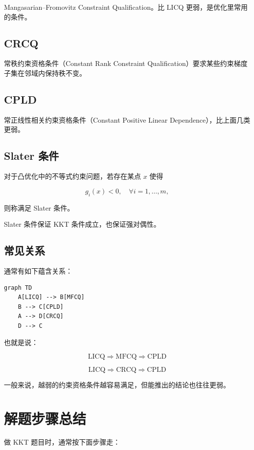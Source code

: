Mangasarian–Fromovitz Constraint Qualification。比 LICQ 更弱，是优化里常用的条件。

\subsection{CRCQ}

常秩约束资格条件（Constant Rank Constraint Qualification）要求某些约束梯度子集在邻域内保持秩不变。

\subsection{CPLD}

常正线性相关约束资格条件（Constant Positive Linear Dependence），比上面几类更弱。

\subsection{Slater 条件}

对于凸优化中的不等式约束问题，若存在某点 \(x\) 使得

\[
g_i(x) < 0,\quad \forall i=1,\dots,m,
\]

则称满足 Slater 条件。

Slater 条件保证 KKT 条件成立，也保证强对偶性。

\subsection{常见关系}

通常有如下蕴含关系：

\begin{verbatim}
graph TD
    A[LICQ] --> B[MFCQ]
    B --> C[CPLD]
    A --> D[CRCQ]
    D --> C
\end{verbatim}

也就是说：

\[
\mathrm{LICQ} \Rightarrow \mathrm{MFCQ} \Rightarrow \mathrm{CPLD}
\]

\[
\mathrm{LICQ} \Rightarrow \mathrm{CRCQ} \Rightarrow \mathrm{CPLD}
\]

一般来说，越弱的约束资格条件越容易满足，但能推出的结论也往往更弱。

\section{解题步骤总结}

做 KKT 题目时，通常按下面步骤走：

